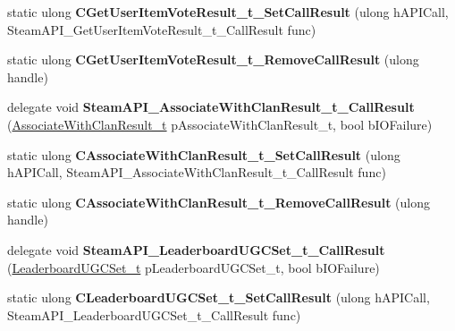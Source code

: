 \begin{DoxyCompactItemize}
static ulong {\bfseries C\+Get\+User\+Item\+Vote\+Result\+\_\+t\+\_\+\+Set\+Call\+Result} (ulong h\+A\+P\+I\+Call, Steam\+A\+P\+I\+\_\+\+Get\+User\+Item\+Vote\+Result\+\_\+t\+\_\+\+Call\+Result func)
\item 
\mbox{\label{class_valve_1_1_interop_1_1_native_entrypoints_a6543b1a9e9ab5d55ea570c3584f3cfae}} 
static ulong {\bfseries C\+Get\+User\+Item\+Vote\+Result\+\_\+t\+\_\+\+Remove\+Call\+Result} (ulong handle)
\item 
\mbox{\label{class_valve_1_1_interop_1_1_native_entrypoints_adce5af8751a47c7d2f7fe594f23a22cd}} 
delegate void {\bfseries Steam\+A\+P\+I\+\_\+\+Associate\+With\+Clan\+Result\+\_\+t\+\_\+\+Call\+Result} (\hyperlink{struct_valve_1_1_steamworks_1_1_associate_with_clan_result__t}{Associate\+With\+Clan\+Result\+\_\+t} p\+Associate\+With\+Clan\+Result\+\_\+t, bool b\+I\+O\+Failure)
\item 
\mbox{\label{class_valve_1_1_interop_1_1_native_entrypoints_a6e626b6dabe62fb7285c4cf6702dd027}} 
static ulong {\bfseries C\+Associate\+With\+Clan\+Result\+\_\+t\+\_\+\+Set\+Call\+Result} (ulong h\+A\+P\+I\+Call, Steam\+A\+P\+I\+\_\+\+Associate\+With\+Clan\+Result\+\_\+t\+\_\+\+Call\+Result func)
\item 
\mbox{\label{class_valve_1_1_interop_1_1_native_entrypoints_a85d087efb16823fdea3d50dd04bfadc0}} 
static ulong {\bfseries C\+Associate\+With\+Clan\+Result\+\_\+t\+\_\+\+Remove\+Call\+Result} (ulong handle)
\item 
\mbox{\label{class_valve_1_1_interop_1_1_native_entrypoints_af26cf6c0a7c443e912f1830f152a6f41}} 
delegate void {\bfseries Steam\+A\+P\+I\+\_\+\+Leaderboard\+U\+G\+C\+Set\+\_\+t\+\_\+\+Call\+Result} (\hyperlink{struct_valve_1_1_steamworks_1_1_leaderboard_u_g_c_set__t}{Leaderboard\+U\+G\+C\+Set\+\_\+t} p\+Leaderboard\+U\+G\+C\+Set\+\_\+t, bool b\+I\+O\+Failure)
\item 
\mbox{\label{class_valve_1_1_interop_1_1_native_entrypoints_a9a8cf97e0c1e3082e0faa27002faab5a}} 
static ulong {\bfseries C\+Leaderboard\+U\+G\+C\+Set\+\_\+t\+\_\+\+Set\+Call\+Result} (ulong h\+A\+P\+I\+Call, Steam\+A\+P\+I\+\_\+\+Leaderboard\+U\+G\+C\+Set\+\_\+t\+\_\+\+Call\+Result func)

\end{DoxyCompactItemize}
